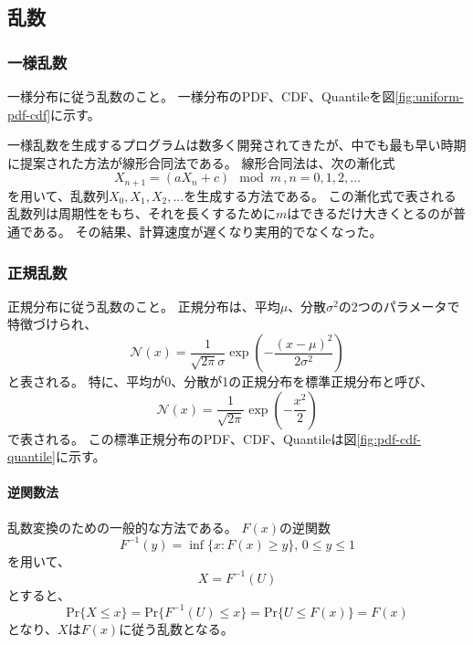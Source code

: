 \subsection{乱数}

\subsubsection{一様乱数}
一様分布に従う乱数のこと。
一様分布のPDF、CDF、Quantileを図\ref{fig:uniform-pdf-cdf}に示す。

一様乱数を生成するプログラムは数多く開発されてきたが、中でも最も早い時期に提案された方法が線形合同法である。
線形合同法は、次の漸化式
\begin{equation*}
	X_{n+1} = (aX_n + c) \mod m \,, n = 0, 1, 2, \ldots
\end{equation*}
を用いて、乱数列$X_0, X_1, X_2, \ldots$を生成する方法である。
この漸化式で表される乱数列は周期性をもち、それを長くするために$m$はできるだけ大きくとるのが普通である。
その結果、計算速度が遅くなり実用的でなくなった。

\subsubsection{正規乱数}
正規分布に従う乱数のこと。
正規分布は、平均$\mu$、分散$\sigma^2$の2つのパラメータで特徴づけられ、
\begin{equation*}
	\mathcal{N}(x) = \frac{1}{\sqrt{2\pi}\sigma} \exp\left(-\frac{(x-\mu)^2}{2\sigma^2}\right)
\end{equation*}
と表される。
特に、平均が0、分散が1の正規分布を標準正規分布と呼び、
\begin{equation}
	\mathcal{N}(x) = \frac{1}{\sqrt{2\pi}} \exp\left(-\frac{x^2}{2}\right)
\end{equation}
で表される。
この標準正規分布のPDF、CDF、Quantileは図\ref{fig:pdf-cdf-quantile}に示す。

\paragraph{逆関数法}
乱数変換のための一般的な方法である。
$F(x)$の逆関数
\begin{equation*}
	F^{-1}(y) = \inf\{x: F(x) \geq y \},\, 0 \leq y \leq 1
\end{equation*}
を用いて、
\begin{equation}\label{eq:inverse-function}
	X = F^{-1}(U)
\end{equation}
とすると、
\begin{equation*}
	\mathrm{Pr}\{X \leq x\} = \mathrm{Pr}\{F^{-1}(U) \leq x\} = \mathrm{Pr}\{U \leq F(x)\} = F(x)
\end{equation*}
となり、$X$は$F(x)$に従う乱数となる。


